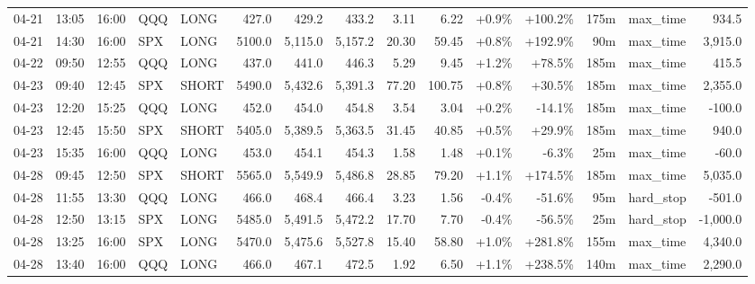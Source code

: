 \documentclass[11pt,a4paper,twoside]{article}
\begin{document}
\begin{landscape}
\begin{center}
\begin{longtable}{>{\color{txtmain}}l l l l l r r r r r r r r >{\color{txtmain}}l r}
04-21 & 13:05 & 16:00 & QQQ & LONG & 427.0 & 429.2 & 433.2 & 3.11 & 6.22 & \textcolor{wingreen}{+0.9\%} & \textcolor{wingreen}{+100.2\%} & 175m & max\_time & \textcolor{wingreen}{934.5} \\
04-21 & 14:30 & 16:00 & SPX & LONG & 5100.0 & 5,115.0 & 5,157.2 & 20.30 & 59.45 & \textcolor{wingreen}{+0.8\%} & \textcolor{wingreen}{+192.9\%} & 90m & max\_time & \textcolor{wingreen}{3,915.0} \\
04-22 & 09:50 & 12:55 & QQQ & LONG & 437.0 & 441.0 & 446.3 & 5.29 & 9.45 & \textcolor{wingreen}{+1.2\%} & \textcolor{wingreen}{+78.5\%} & 185m & max\_time & \textcolor{wingreen}{415.5} \\
04-23 & 09:40 & 12:45 & SPX & SHORT & 5490.0 & 5,432.6 & 5,391.3 & 77.20 & 100.75 & \textcolor{wingreen}{+0.8\%} & \textcolor{wingreen}{+30.5\%} & 185m & max\_time & \textcolor{wingreen}{2,355.0} \\
04-23 & 12:20 & 15:25 & QQQ & LONG & 452.0 & 454.0 & 454.8 & 3.54 & 3.04 & \textcolor{wingreen}{+0.2\%} & \textcolor{lossred}{-14.1\%} & 185m & max\_time & \textcolor{lossred}{-100.0} \\
04-23 & 12:45 & 15:50 & SPX & SHORT & 5405.0 & 5,389.5 & 5,363.5 & 31.45 & 40.85 & \textcolor{wingreen}{+0.5\%} & \textcolor{wingreen}{+29.9\%} & 185m & max\_time & \textcolor{wingreen}{940.0} \\
04-23 & 15:35 & 16:00 & QQQ & LONG & 453.0 & 454.1 & 454.3 & 1.58 & 1.48 & \textcolor{wingreen}{+0.1\%} & \textcolor{lossred}{-6.3\%} & 25m & max\_time & \textcolor{lossred}{-60.0} \\
04-28 & 09:45 & 12:50 & SPX & SHORT & 5565.0 & 5,549.9 & 5,486.8 & 28.85 & 79.20 & \textcolor{wingreen}{+1.1\%} & \textcolor{wingreen}{+174.5\%} & 185m & max\_time & \textcolor{wingreen}{5,035.0} \\
04-28 & 11:55 & 13:30 & QQQ & LONG & 466.0 & 468.4 & 466.4 & 3.23 & 1.56 & \textcolor{lossred}{-0.4\%} & \textcolor{lossred}{-51.6\%} & 95m & hard\_stop & \textcolor{lossred}{-501.0} \\
04-28 & 12:50 & 13:15 & SPX & LONG & 5485.0 & 5,491.5 & 5,472.2 & 17.70 & 7.70 & \textcolor{lossred}{-0.4\%} & \textcolor{lossred}{-56.5\%} & 25m & hard\_stop & \textcolor{lossred}{-1,000.0} \\
04-28 & 13:25 & 16:00 & SPX & LONG & 5470.0 & 5,475.6 & 5,527.8 & 15.40 & 58.80 & \textcolor{wingreen}{+1.0\%} & \textcolor{wingreen}{+281.8\%} & 155m & max\_time & \textcolor{wingreen}{4,340.0} \\
04-28 & 13:40 & 16:00 & QQQ & LONG & 466.0 & 467.1 & 472.5 & 1.92 & 6.50 & \textcolor{wingreen}{+1.1\%} & \textcolor{wingreen}{+238.5\%} & 140m & max\_time & \textcolor{wingreen}{2,290.0} \\

\end{longtable}
\end{center}
\end{landscape}
\end{document}
